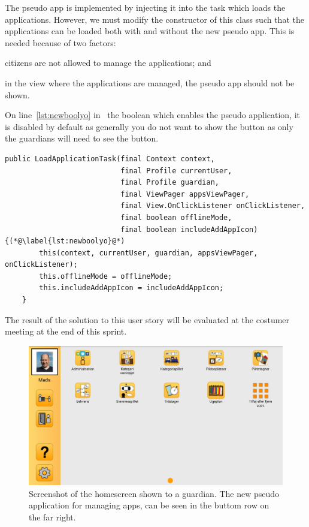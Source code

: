 The pseudo app is implemented by injecting it into the task which loads the applications.
However, we must modify the constructor of this class such that the applications can be loaded both with and without the new pseudo app.
This is needed because of two factors: 
\begin{enumberate*}
    \item citizens are not allowed to manage the applications; and
    \item in the view where the applications are managed, the pseudo app should not be shown.
\end{enumberate*}
On line~\ref{lst:newboolyo} in~ the boolean which enables the pseudo application, it is disabled by default as generally you do not want to show the button as only the guardians will need to see the button.

\begin{lstlisting}[float, floatplacement=h!, label={lst:modified_constructor}, caption={The new constructor which instantiates the task that loads the applications in the GIRAF launcher}] 
public LoadApplicationTask(final Context context,
                           final Profile currentUser,
                           final Profile guardian,
                           final ViewPager appsViewPager,
                           final View.OnClickListener onClickListener,
                           final boolean offlineMode,
                           final boolean includeAddAppIcon) {(*@\label{lst:newboolyo}@*) 
        this(context, currentUser, guardian, appsViewPager, onClickListener);
        this.offlineMode = offlineMode;
        this.includeAddAppIcon = includeAddAppIcon;
    }
\end{lstlisting}

\bigskip
The result of the solution to this user story will be evaluated at the costumer meeting at the end of this sprint.

\begin{figure}[h!]
    \includegraphics[width=\textwidth]{figures/img/screenshots/addapps_icon.png}
    \caption{Screenshot of the homescreen shown to a guardian. The new pseudo application for managing apps, can be seen in the buttom row on the far right.}\label{fig:addapps}
\end{figure}
